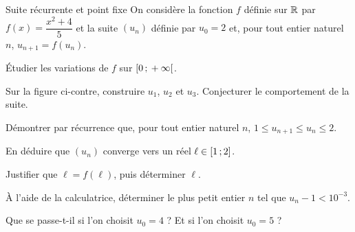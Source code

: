 \begin{exercice}[3]{Suite récurrente et point fixe}
On considère la fonction $f$ définie sur $\mathbb{R}$ par $f(x)=\dfrac{x^{2}+4}{5}$ et la suite $(u_n)$ définie par $u_0=2$ et,
pour tout entier naturel $n$, $u_{n+1}=f(u_n)$.

\noindent
\begin{minipage}[c]{0.56\linewidth}
\begin{questions}
  \item Étudier les variations de $f$ sur $\mathopen{[}0\,{;}\,+\infty\mathclose{[}$.
  \item Sur la figure ci-contre, construire $u_1$, $u_2$ et $u_3$. Conjecturer le comportement de la suite.
  \item Démontrer par récurrence que, pour tout entier naturel $n$, $1\leq u_{n+1}\leq u_n\leq2$.
  \item En déduire que $(u_n)$ converge vers un réel $\ell\in\mathopen{[}1\,{;}\,2\mathclose{]}$.
\end{questions}
\end{minipage}\hfill
\begin{minipage}[c]{0.4\linewidth}
\centering
{}
\end{minipage}
\begin{questions}[start=5]
  \item Justifier que $\ell=f(\ell)$, puis déterminer $\ell$.
  \item À l'aide de la calculatrice, déterminer le plus petit entier $n$ tel que $u_n-1<10^{-3}$.
  \item Que se passe-t-il si l'on choisit $u_0=4$ ? Et si l'on choisit $u_0=5$ ?
\end{questions}
\end{exercice}

